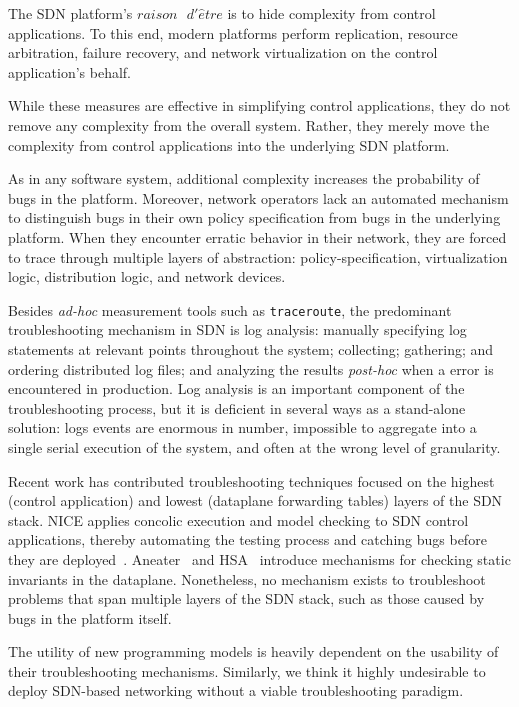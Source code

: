 The SDN platform's $raison\text{ }d'\hat{e}tre$ is to 
hide complexity from control applications. To this end, modern platforms perform
replication, resource arbitration, failure recovery, and network 
virtualization on the control application's behalf. 

While these measures are effective in simplifying control applications,
they do not remove any complexity from the overall system. Rather, they merely move the complexity
from control applications into the underlying SDN platform.

As in any software system, additional complexity increases the probability of
bugs in the platform. Moreover, network operators lack an automated mechanism to
distinguish bugs in their own policy specification from bugs in the underlying
platform. When they encounter erratic behavior in their network,
they are forced to trace through
multiple layers of abstraction: policy-specification, virtualization logic, distribution logic, and
network devices.

Besides {\it ad-hoc} measurement tools
such as {\tt traceroute}, the predominant troubleshooting mechanism in SDN is
log analysis: manually specifying log statements at relevant points throughout the system;
collecting; gathering; and ordering distributed log files; and analyzing the
results {\it post-hoc} when a error is encountered in production. Log analysis
is an important component of the troubleshooting process, but it is deficient
in several ways as a stand-alone solution: logs events
are enormous in number, impossible to aggregate into a single serial
execution of the system, and often at the wrong level of granularity.

Recent work has contributed troubleshooting techniques focused on the highest (control
application) and lowest (dataplane forwarding tables) layers of the SDN stack.
NICE applies concolic execution and model checking to SDN control
applications, thereby automating the testing process and catching bugs before
they are deployed~\cite{nice}. Aneater~\cite{anteater} and HSA~\cite{hsa}
introduce mechanisms for checking static invariants in the dataplane.
Nonetheless, no mechanism exists to troubleshoot problems that span
multiple layers of the SDN stack, such as those caused by bugs in the platform
itself.

The utility of new programming models is heavily dependent on
the usability of their troubleshooting mechanisms.
Similarly, we think it highly undesirable to deploy SDN-based
networking without a viable troubleshooting paradigm. 

